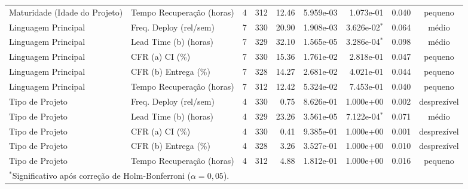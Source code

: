 \begin{table}[ht]
\begin{tabular}{llrrrrrcc}
Maturidade (Idade do Projeto) & Tempo Recuperação (horas) & 4 & 312 & 12.46 & 5.959e-03 & 1.073e-01 & 0.040 & pequeno \\
Linguagem Principal & Freq. Deploy (rel/sem) & 7 & 330 & 20.90 & 1.908e-03 & 3.626e-02$^*$ & 0.064 & médio \\
Linguagem Principal & Lead Time (b) (horas) & 7 & 329 & 32.10 & 1.565e-05 & 3.286e-04$^*$ & 0.098 & médio \\
Linguagem Principal & CFR (a) CI (\%) & 7 & 330 & 15.36 & 1.761e-02 & 2.818e-01 & 0.047 & pequeno \\
Linguagem Principal & CFR (b) Entrega (\%) & 7 & 328 & 14.27 & 2.681e-02 & 4.021e-01 & 0.044 & pequeno \\
Linguagem Principal & Tempo Recuperação (horas) & 7 & 312 & 12.42 & 5.324e-02 & 7.453e-01 & 0.040 & pequeno \\
Tipo de Projeto & Freq. Deploy (rel/sem) & 4 & 330 & 0.75 & 8.626e-01 & 1.000e+00 & 0.002 & desprezível \\
Tipo de Projeto & Lead Time (b) (horas) & 4 & 329 & 23.26 & 3.561e-05 & 7.122e-04$^*$ & 0.071 & médio \\
Tipo de Projeto & CFR (a) CI (\%) & 4 & 330 & 0.41 & 9.385e-01 & 1.000e+00 & 0.001 & desprezível \\
Tipo de Projeto & CFR (b) Entrega (\%) & 4 & 328 & 3.26 & 3.527e-01 & 1.000e+00 & 0.010 & desprezível \\
Tipo de Projeto & Tempo Recuperação (horas) & 4 & 312 & 4.88 & 1.812e-01 & 1.000e+00 & 0.016 & pequeno \\
\bottomrule
\multicolumn{9}{l}{\footnotesize $^*$Significativo após correção de Holm-Bonferroni ($\alpha = 0{,}05$).}\\
\end{tabular}
\end{table}